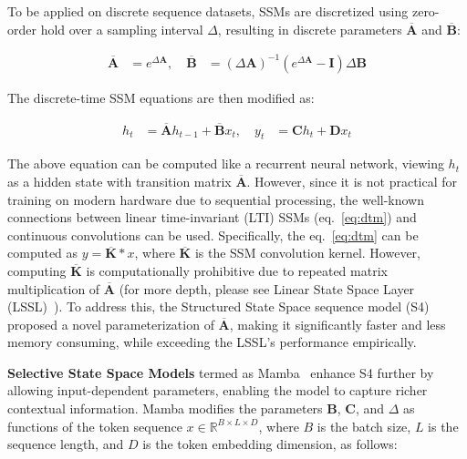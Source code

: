 To be applied on discrete sequence datasets, SSMs are discretized using zero-order hold over a sampling interval $\Delta$, resulting in discrete parameters $\overline{\mathbf{A}}$ and $\overline{\mathbf{B}}$:

\begin{equation}
\begin{aligned}
\overline{\mathbf{A}} &= e^{\Delta \mathbf{A}}, \quad 
\overline{\mathbf{B}} &= (\Delta \mathbf{A})^{-1} \left( e^{\Delta \mathbf{A}} - \mathbf{I} \right) \Delta \mathbf{B}
\end{aligned}
\label{eq:discrete}
\end{equation}

The discrete-time SSM equations are then modified as:

\begin{equation}
\begin{aligned}
h_t &= \overline{\mathbf{A}} h_{t-1} + \overline{\mathbf{B}} x_t, \quad y_t &= \mathbf{C} h_t + \mathbf{D} x_t
\end{aligned}
\label{eq:dtm}
\end{equation}


The above equation can be computed like a recurrent neural network, viewing $h_t$ as a hidden state with transition matrix $\overline{\mathbf{A}}$. However, since it is not practical for training on modern hardware due to sequential processing, the well-known connections between linear time-invariant (LTI) SSMs (eq.~\ref{eq:dtm}) and continuous convolutions can be used. Specifically, the eq.~\ref{eq:dtm} can be computed as $y = \overline{\mathbf{K}} * x$, where $\overline{\mathbf{K}}$ is the SSM convolution kernel. However, computing $\overline{\mathbf{K}}$ is computationally prohibitive due to repeated matrix multiplication of $\overline{\mathbf{A}}$ (for more depth, please see Linear State Space Layer (LSSL)~\cite{gu2021combining}). To address this, the Structured State Space sequence model (S4)~\cite{gu2021efficiently} proposed a novel parameterization of $\overline{\mathbf{A}}$, making it significantly faster and less memory consuming, while exceeding the LSSL’s performance empirically.


\noindent \textbf{Selective State Space Models} termed as Mamba~\cite{mamba} enhance S4 further by allowing input-dependent parameters, enabling the model to capture richer contextual information. Mamba modifies the parameters $\mathbf{B}$, $\mathbf{C}$, and $\Delta$ as functions of the token sequence $x \in \mathbb{R}^{B \times L \times D}$, where $B$ is the batch size, $L$ is the sequence length, and $D$ is the token embedding dimension, as follows:



